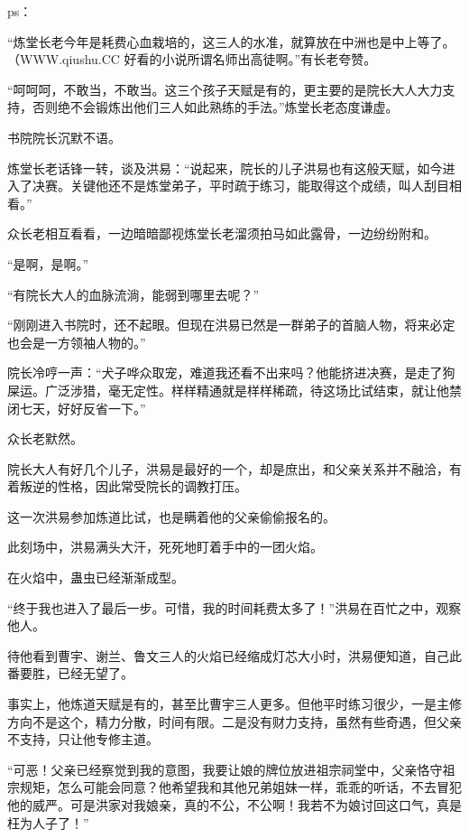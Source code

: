 
\begin{this_body}

ps：

“炼堂长老今年是耗费心血栽培的，这三人的水准，就算放在中洲也是中上等了。（WWW.qiushu.CC 好看的小说所谓名师出高徒啊。”有长老夸赞。

“呵呵呵，不敢当，不敢当。这三个孩子天赋是有的，更主要的是院长大人大力支持，否则绝不会锻炼出他们三人如此熟练的手法。”炼堂长老态度谦虚。

书院院长沉默不语。

炼堂长老话锋一转，谈及洪易：“说起来，院长的儿子洪易也有这般天赋，如今进入了决赛。关键他还不是炼堂弟子，平时疏于练习，能取得这个成绩，叫人刮目相看。”

众长老相互看看，一边暗暗鄙视炼堂长老溜须拍马如此露骨，一边纷纷附和。

“是啊，是啊。”

“有院长大人的血脉流淌，能弱到哪里去呢？”

“刚刚进入书院时，还不起眼。但现在洪易已然是一群弟子的首脑人物，将来必定也会是一方领袖人物的。”

院长冷哼一声：“犬子哗众取宠，难道我还看不出来吗？他能挤进决赛，是走了狗屎运。广泛涉猎，毫无定性。样样精通就是样样稀疏，待这场比试结束，就让他禁闭七天，好好反省一下。”

众长老默然。

院长大人有好几个儿子，洪易是最好的一个，却是庶出，和父亲关系并不融洽，有着叛逆的性格，因此常受院长的调教打压。

这一次洪易参加炼道比试，也是瞒着他的父亲偷偷报名的。

此刻场中，洪易满头大汗，死死地盯着手中的一团火焰。

在火焰中，蛊虫已经渐渐成型。

“终于我也进入了最后一步。可惜，我的时间耗费太多了！”洪易在百忙之中，观察他人。

待他看到曹宇、谢兰、鲁文三人的火焰已经缩成灯芯大小时，洪易便知道，自己此番要胜，已经无望了。

事实上，他炼道天赋是有的，甚至比曹宇三人更多。但他平时练习很少，一是主修方向不是这个，精力分散，时间有限。二是没有财力支持，虽然有些奇遇，但父亲不支持，只让他专修主道。

“可恶！父亲已经察觉到我的意图，我要让娘的牌位放进祖宗祠堂中，父亲恪守祖宗规矩，怎么可能会同意？他希望我和其他兄弟姐妹一样，乖乖的听话，不去冒犯他的威严。可是洪家对我娘亲，真的不公，不公啊！我若不为娘讨回这口气，真是枉为人子了！”


\end{this_body}
